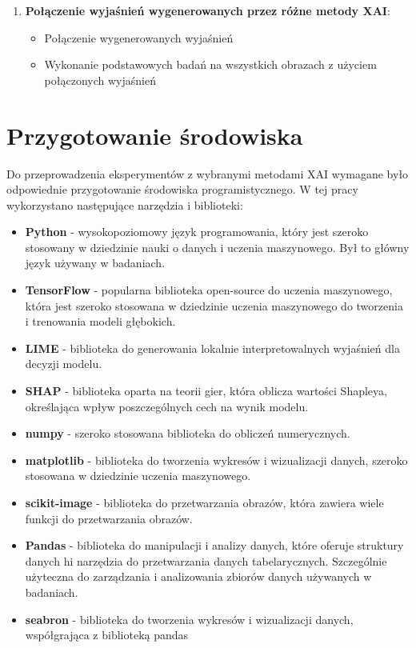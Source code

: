 \begin{enumerate}
	\item \textbf{Połączenie wyjaśnień wygenerowanych przez różne metody XAI}:
	      \begin{itemize}
		      \item Połączenie wygenerowanych wyjaśnień
		      \item Wykonanie podstawowych badań na wszystkich obrazach z użyciem połączonych wyjaśnień
	      \end{itemize}
\end{enumerate}

\section*{Przygotowanie środowiska}

Do przeprowadzenia eksperymentów z wybranymi metodami XAI wymagane było odpowiednie przygotowanie środowiska programistycznego.
W tej pracy wykorzystano  następujące narzędzia i biblioteki:
\begin{itemize}
	\item \textbf{Python}\cite{python} - wysokopoziomowy język programowania, który jest szeroko stosowany w dziedzinie nauki o danych i uczenia maszynowego.
	      Był to główny język używany w badaniach.
	\item \textbf{TensorFlow}\cite{tensorflow} - popularna biblioteka open-source do uczenia maszynowego, która jest szeroko stosowana w dziedzinie uczenia maszynowego do tworzenia i trenowania modeli głębokich.
	\item \textbf{LIME}\cite{limedoc} - biblioteka do generowania lokalnie interpretowalnych wyjaśnień dla decyzji modelu.
	\item \textbf{SHAP}\cite{shapdoc} - biblioteka oparta na teorii gier, która oblicza wartości Shapleya, określająca wpływ poszczególnych cech na wynik modelu.
	\item \textbf{numpy}\cite{numpy} - szeroko stosowana biblioteka do obliczeń numerycznych.
	\item \textbf{matplotlib}\cite{matplotlib} - biblioteka do tworzenia wykresów i wizualizacji danych, szeroko stosowana w dziedzinie uczenia maszynowego.
	\item \textbf{scikit-image}\cite{scikitimage} - biblioteka do przetwarzania obrazów, która zawiera wiele funkcji do przetwarzania obrazów.
	\item \textbf{Pandas}\cite{pandas} - biblioteka do manipulacji i analizy danych, które oferuje struktury danych hi narzędzia do przetwarzania danych tabelarycznych.
	      Szczególnie użyteczna do zarządzania i analizowania zbiorów danych używanych w badaniach.
	\item \textbf{seabron}\cite{seaborn} - biblioteka do tworzenia wykresów i wizualizacji danych, współgrająca z biblioteką pandas
\end{itemize}

